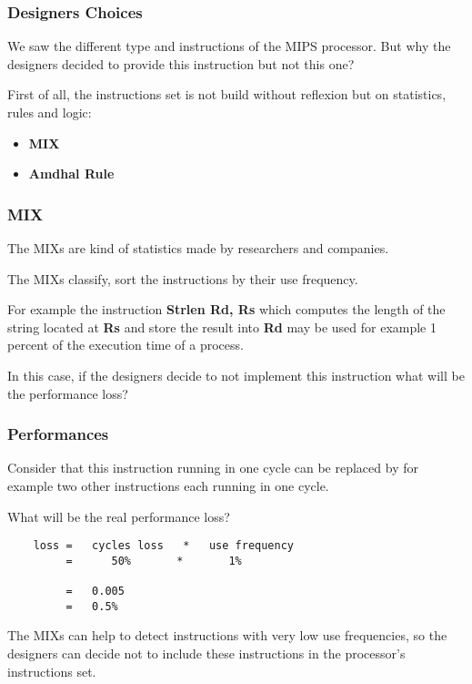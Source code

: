 
\begin{frame}
  \frametitle{Designers Choices}

  We saw the different type and instructions of the MIPS processor. But
  why the designers decided to provide this instruction but not this one?

  \nl

  First of all, the instructions set is not build without reflexion
  but on statistics, rules and logic:

  \begin{itemize}[<+->]
    \item
      \textbf{MIX}
    \item
      \textbf{Amdhal Rule}
  \end{itemize}
\end{frame}


\begin{frame}
  \frametitle{MIX}

  The MIXs are kind of statistics made by researchers and companies.

  \nl

  The MIXs classify, sort the instructions by their use frequency.

  \nl

  For example the instruction \textbf{Strlen Rd, Rs} which computes
  the length of the string located at \textbf{Rs} and store the result
  into \textbf{Rd} may be used for example 1 percent of the execution
  time of a process.

  \nl

  In this case, if the designers decide to not implement this instruction
  what will be the performance loss?
\end{frame}


\begin{frame}[containsverbatim]
  \frametitle{Performances}

  Consider that this instruction running in one cycle can be replaced
  by for example two other instructions each running in one cycle.

  \nl

  What will be the real performance loss?

  \begin{verbatim}
    loss =   cycles loss   *   use frequency
         =      50%       *       1%

         =   0.005
         =   0.5%
  \end{verbatim}

  The MIXs can help to detect instructions with very low use frequencies, so
  the designers can decide not to include these instructions in the
  processor's instructions set.
\end{frame}

